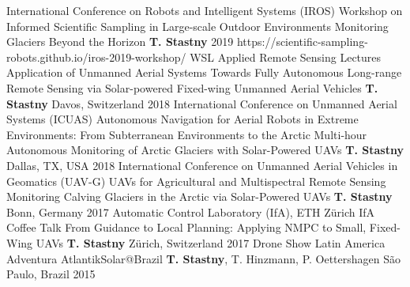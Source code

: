 \label{sec:talks}

\begin{cventries}

\cvtalkentry
	{International Conference on Robots and Intelligent Systems (IROS)} %
	{Workshop on Informed Scientific Sampling in Large-scale Outdoor Environments} %
	{Monitoring Glaciers Beyond the Horizon} %
	{\textbf{T. Stastny}} %
	{} %
	{2019} %
	{https://scientific-sampling-robots.github.io/iros-2019-workshop/} %
%
\cvtalkentry
	{WSL Applied Remote Sensing Lectures} %
	{Application of Unmanned Aerial Systems} %
	{Towards Fully Autonomous Long-range Remote Sensing via Solar-powered Fixed-wing Unmanned Aerial Vehicles} %
	{\textbf{T. Stastny}} %
	{Davos, Switzerland} %
	{2018} %
	{} %
%
\cvtalkentry
	{International Conference on Unmanned Aerial Systems (ICUAS)} %
	{Autonomous Navigation for Aerial Robots in Extreme Environments: From Subterranean Environments to the Arctic} %
	{Multi-hour Autonomous Monitoring of Arctic Glaciers with Solar-Powered UAVs} %
	{\textbf{T. Stastny}} %
	{Dallas, TX, USA} %
	{2018} %
	{} %
%
\cvtalkentry
	{International Conference on Unmanned Aerial Vehicles in Geomatics (UAV-G)} %
	{UAVs for Agricultural and Multispectral Remote Sensing} %
	{Monitoring Calving Glaciers in the Arctic via Solar-Powered UAVs} %
	{\textbf{T. Stastny}} %
	{Bonn, Germany} %
	{2017} %
	{} %
%		
\cvtalkentry
	{Automatic Control Laboratory (IfA), ETH Z\"{u}rich} %
	{IfA Coffee Talk} %
	{From Guidance to Local Planning: Applying NMPC to Small, Fixed-Wing UAVs} %
	{\textbf{T. Stastny}} %
	{Z\"{u}rich, Switzerland} %
	{2017} %
	{} %
%
\cvtalkentry
	{Drone Show Latin America} %
	{} %
	{Adventura AtlantikSolar@Brazil} %
	{\textbf{T. Stastny}, T. Hinzmann, P. Oettershagen} %
	{S\~{a}o Paulo, Brazil} %
	{2015} %
	{} %
%
\end{cventries}

